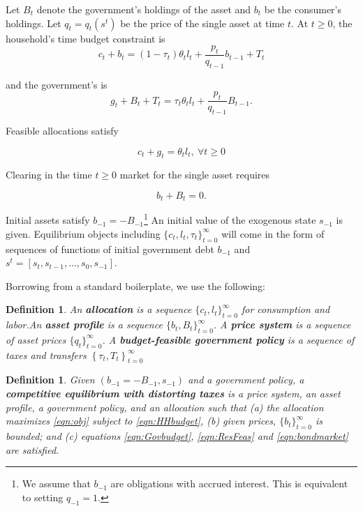 \documentclass[12pt]{article}
\newtheorem{definition}[theorem]{Definition}
\begin{document}
Let $B_t$ denote the government's holdings of the asset and $b_t$ be the consumer's holdings.
Let $q_t= q_t(s^t)$ be the price of the single  asset at time $t$.
 At $t \geq 0$, the household's time budget constraint is
 \begin{equation}
 \label{eqn:HHbudget}
 c_{t}+b_{t}=\left( 1-\tau _{t}\right) \theta _{t}l_{t}+\frac{p_{t}}{q_{t-1}}b_{t-1}+T_{t}
 \end{equation}

 and the government's is
 \begin{equation}
 \label{eqn:Govbudget}
g_{t}+B_{t}+T_t=\tau _{t}\theta_{t}l_{t}+\frac{p_{t}}{q_{t-1}}B_{t-1}.
 \end{equation}


Feasible allocations satisfy

\begin{equation}
 \label{eqn:ResFeas}
 c_{t}+g_t = \theta _{t} l_{t}, \ \forall t \geq 0
 \end{equation}

 Clearing in the time $t \geq 0$ market for the single asset requires


\begin{equation}
 \label{eqn:bondmarket}
 b_{t}+B_{t}=0.
 \end{equation}

 Initial assets satisfy $b_{-1}=-B_{-1}$\footnote{We assume that $b_{-1}$ are obligations with accrued interest. This is equivalent to setting $q_{-1}=1$.} An initial value of the exogenous state  $s_{-1}$ is given.
Equilibrium objects including $\{c_t, l_t, \tau_t\}_{t=0}^\infty$ will come in the form of sequences of functions of  initial government debt  $b_{-1}$ and  $s^t = [s_t, s_{t-1}, \ldots, s_0, s_{-1}]$.


Borrowing from a standard boilerplate, we use the following:

\begin{definition}
An \textbf{allocation} is a sequence $\{c_t,l_t\}_{t=0}^\infty$ for consumption and labor.An \textbf{asset profile}  is a sequence $\{b_t,B_t\}_{t=0}^\infty$. A \textbf{price system} is a sequence of asset prices $\{q_t\}_{t=0}^\infty$.  A \textbf{budget-feasible government policy} is a sequence of taxes and transfers $\left\{ \tau _{t},T_{t}\right\} _{t=0}^{\infty }$
\end{definition}

\begin{definition}
Given  $\left(b_{-1}=-B_{-1},s_{-1}\right) $ and a government policy,  a \textbf{competitive equilibrium
with distorting taxes} is a price system, an asset profile, a %
government policy, and an allocation such that (a)
the allocation maximizes \eqref{eqn:obj} subject to \eqref{eqn:HHbudget}, (b) given prices, $\{b_{t}\}_{t=0}^\infty$ is bounded; and  (c)
equations \eqref{eqn:Govbudget}, \eqref{eqn:ResFeas} and \eqref{eqn:bondmarket} are satisfied.
\end{definition}
\end{document}
